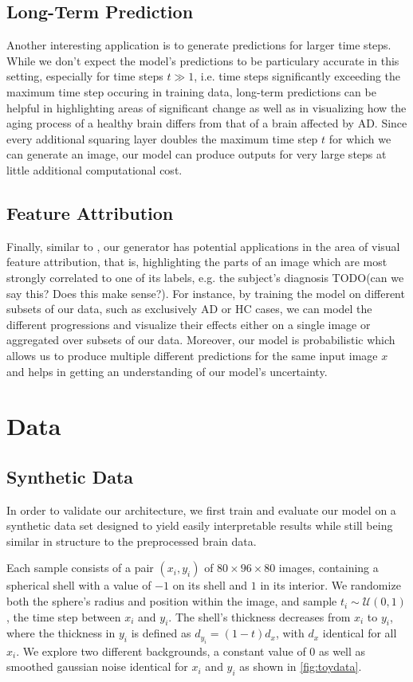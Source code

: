 \section{Long-Term Prediction}
\label{sec:adalongterm}
Another interesting application is to generate predictions for larger time steps. While we don't expect the model's predictions to be particulary accurate in this setting, especially for time steps $t \gg 1$, i.e. time steps significantly exceeding the maximum time step occuring in training data, long-term predictions can be helpful in highlighting areas of significant change as well as in visualizing how the aging process of a healthy brain differs from that of a brain affected by AD. Since every additional squaring layer doubles the maximum time step $t$ for which we can generate an image, our model can produce outputs for very large steps at little additional computational cost.

\section{Feature Attribution}
Finally, similar to \cite{baumgartner2018visual}, our generator has potential applications in the area of visual feature attribution, that is, highlighting the parts of an image which are most strongly correlated to one of its labels, e.g. the subject's diagnosis TODO(can we say this? Does this make sense?).
For instance, by training the model on different subsets of our data, such as exclusively AD or HC cases, we can model the different progressions and visualize their effects either on a single image or aggregated over subsets of our data.
Moreover, our model is probabilistic which allows us to produce multiple different predictions for the same input image $x$ and helps in getting an understanding of our model's uncertainty.

\chapter{Data}

\section{Synthetic Data}
\label{sec:datsynth}
In order to validate our architecture, we first train and evaluate our model on a synthetic data set designed to yield easily interpretable results while still being similar in structure to the preprocessed brain data.

Each sample consists of a pair $(x_i, y_i)$ of $ 80 \times 96 \times 80 $ images, containing a spherical shell with a value of $-1$ on its shell and $1$ in its interior. We randomize both the sphere's radius and position within the image, and sample $t_i \sim \mathcal{U}(0, 1)$, the time step between $x_i$ and $y_i$. The shell's thickness decreases from $x_i$ to $y_i$, where the thickness in $y_i$ is defined as $d_{y_i} = (1-t) d_x$, with $d_x$ identical for all $x_i$. We explore two different backgrounds, a constant value of 0 as well as smoothed gaussian noise identical for $x_i$ and $y_i$ as shown in \autoref{fig:toydata}.

